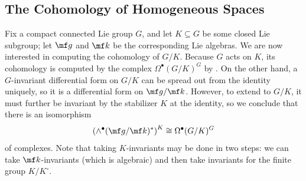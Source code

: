 \documentclass[../notes.tex]{subfiles}
\begin{document}
\subsection{The Cohomology of Homogeneous Spaces}
Fix a compact connected Lie group $G$, and let $K\subseteq G$ be some closed Lie subgroup; let $\mf g$ and $\mf k$ be the corresponding Lie algebras. We are now interested in computing the cohomology of $G/K$. Because $G$ acts on $K$, its cohomology is computed by the complex $\Omega^\bullet(G/K)^G$ by . On the other hand, a $G$-invariant differential form on $G/K$ can be spread out from the identity uniquely, so it is a differential form on $\mf g/\mf k$. However, to extend to $G/K$, it must further be invariant by the stabilizer $K$ at the identity, so we conclude that there is an isomorphism
\[\left(\land^\bullet(\mf g/\mf k)^*\right)^K\cong\Omega^\bullet(G/K)^G\]
of complexes. Note that taking $K$-invariants may be done in two steps: we can take $\mf k$-invariants (which is algebraic) and then take invariants for the finite group $K/K^\circ$.
\end{document}
